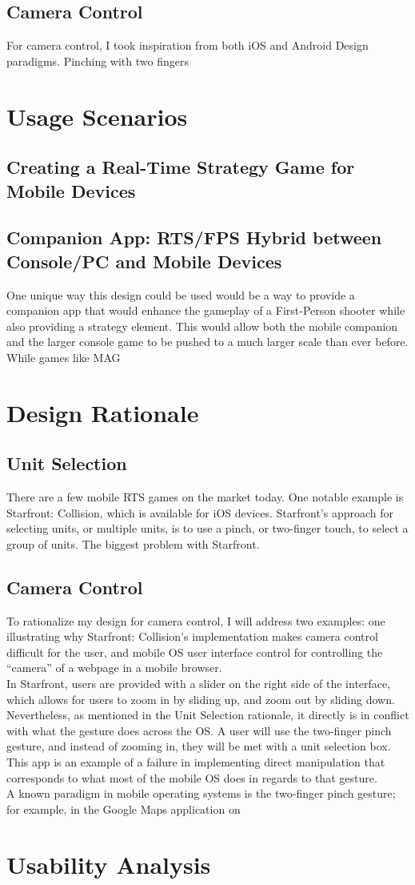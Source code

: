 \documentclass[11pt]{article}
\begin{document}
	\subsection{Camera Control}
	For camera control, I took inspiration from both iOS and Android Design paradigms. Pinching with two fingers
\section{Usage Scenarios}
	\subsection{Creating a Real-Time Strategy Game for Mobile Devices}
	\subsection{Companion App: RTS/FPS Hybrid between Console/PC and Mobile Devices}
	One unique way this design could be used would be a way to provide a companion app that would enhance the gameplay of a First-Person shooter while also providing a strategy element. This would allow both the mobile companion and the larger console game to be pushed to a much larger scale than ever before. While games like MAG
\section{Design Rationale}
	\subsection{Unit Selection}
	There are a few mobile RTS games on the market today. One notable example is Starfront: Collision, which is available for iOS devices. Starfront's approach for selecting units, or multiple units, is to use a pinch, or two-finger touch, to select a group of units. The biggest problem with Starfront.
	\subsection{Camera Control}
	To rationalize my design for camera control, I will address two examples: one illustrating why Starfront: Collision's implementation makes camera control difficult for the user, and mobile OS user interface control for controlling the ``camera'' of a webpage in a mobile browser. \\
	In Starfront, users are provided with a slider on the right side of the interface, which allows for users to zoom in by sliding up, and zoom out by sliding down. Nevertheless, as mentioned in the Unit Selection rationale, it directly is in conflict with what the gesture does across the OS. A user will use the two-finger pinch gesture, and instead of zooming in, they will be met with a unit selection box. This app is an example of a failure in implementing direct manipulation that corresponds to what most of the mobile OS does in regards to that gesture. \\
	A known paradigm in mobile operating systems is the two-finger pinch gesture; for example, in the Google Maps application on
\section{Usability Analysis}
\end{document}
